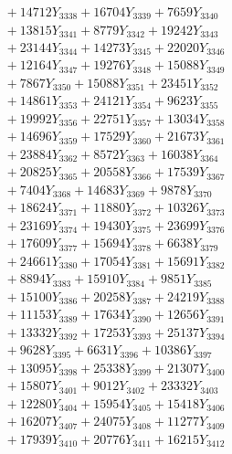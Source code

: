 \documentclass[a4paper,10pt]{article}
\begin{document}
{\begin{align}
&\;  + 14712 Y_{3338} + 16704 Y_{3339} + 7659 Y_{3340} \\[0.3ex]
&\;  + 13815 Y_{3341} + 8779 Y_{3342} + 19242 Y_{3343} \\[0.3ex]
&\;  + 23144 Y_{3344} + 14273 Y_{3345} + 22020 Y_{3346} \\[0.3ex]
&\;  + 12164 Y_{3347} + 19276 Y_{3348} + 15088 Y_{3349} \\[0.3ex]
&\;  + 7867 Y_{3350} + 15088 Y_{3351} + 23451 Y_{3352} \\[0.3ex]
&\;  + 14861 Y_{3353} + 24121 Y_{3354} + 9623 Y_{3355} \\[0.3ex]
&\;  + 19992 Y_{3356} + 22751 Y_{3357} + 13034 Y_{3358} \\[0.5ex]\allowbreak
&\;  + 14696 Y_{3359} + 17529 Y_{3360} + 21673 Y_{3361} \\[0.3ex]
&\;  + 23884 Y_{3362} + 8572 Y_{3363} + 16038 Y_{3364} \\[0.3ex]
&\;  + 20825 Y_{3365} + 20558 Y_{3366} + 17539 Y_{3367} \\[0.3ex]
&\;  + 7404 Y_{3368} + 14683 Y_{3369} + 9878 Y_{3370} \\[0.3ex]
&\;  + 18624 Y_{3371} + 11880 Y_{3372} + 10326 Y_{3373} \\[0.3ex]
&\;  + 23169 Y_{3374} + 19430 Y_{3375} + 23699 Y_{3376} \\[0.3ex]
&\;  + 17609 Y_{3377} + 15694 Y_{3378} + 6638 Y_{3379} \\[0.3ex]
&\;  + 24661 Y_{3380} + 17054 Y_{3381} + 15691 Y_{3382} \\[0.3ex]
&\;  + 8894 Y_{3383} + 15910 Y_{3384} + 9851 Y_{3385} \\[0.3ex]
&\;  + 15100 Y_{3386} + 20258 Y_{3387} + 24219 Y_{3388} \\[0.5ex]\allowbreak
&\;  + 11153 Y_{3389} + 17634 Y_{3390} + 12656 Y_{3391} \\[0.3ex]
&\;  + 13332 Y_{3392} + 17253 Y_{3393} + 25137 Y_{3394} \\[0.3ex]
&\;  + 9628 Y_{3395} + 6631 Y_{3396} + 10386 Y_{3397} \\[0.3ex]
&\;  + 13095 Y_{3398} + 25338 Y_{3399} + 21307 Y_{3400} \\[0.3ex]
&\;  + 15807 Y_{3401} + 9012 Y_{3402} + 23332 Y_{3403} \\[0.3ex]
&\;  + 12280 Y_{3404} + 15954 Y_{3405} + 15418 Y_{3406} \\[0.3ex]
&\;  + 16207 Y_{3407} + 24075 Y_{3408} + 11277 Y_{3409} \\[0.3ex]
&\;  + 17939 Y_{3410} + 20776 Y_{3411} + 16215 Y_{3412} \\[0.3ex]

\end{align}}
\end{document}
